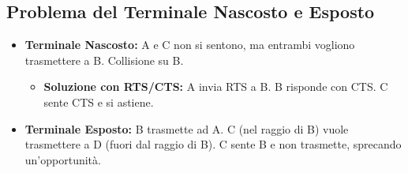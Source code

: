 \subsection{Problema del Terminale Nascosto e Esposto}
\begin{itemize}
    \item \textbf{Terminale Nascosto:} A e C non si sentono, ma entrambi vogliono trasmettere a B. Collisione su B.
    \begin{itemize}
        \item \textbf{Soluzione con RTS/CTS:} A invia RTS a B. B risponde con CTS. C sente CTS e si astiene.
    \end{itemize}
    \item \textbf{Terminale Esposto:} B trasmette ad A. C (nel raggio di B) vuole trasmettere a D (fuori dal raggio di B). C sente B e non trasmette, sprecando un'opportunità.
\end{itemize}

